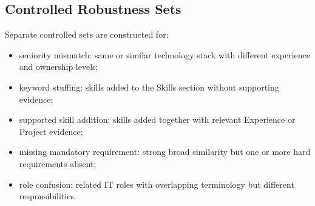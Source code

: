\documentclass[12pt,a4paper,oneside]{report}
\begin{document}
\subsection{Controlled Robustness Sets}
\label{sec:robustness-sets}
Separate controlled sets are constructed for:
\begin{itemize}
  \item seniority mismatch: same or similar technology stack with different experience and ownership levels;
  \item keyword stuffing: skills added to the Skills section without supporting evidence;
  \item supported skill addition: skills added together with relevant Experience or Project evidence;
  \item missing mandatory requirement: strong broad similarity but one or more hard requirements absent;
  \item role confusion: related IT roles with overlapping terminology but different responsibilities.
\end{itemize}
\end{document}
